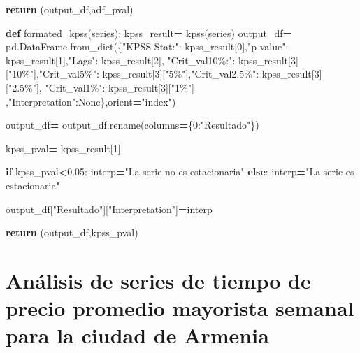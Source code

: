 \documentclass[
]{book}
\newenvironment{Shaded}{\begin{snugshade}}{\end{snugshade}}
\newcommand{\ControlFlowTok}[1]{\textcolor[rgb]{0.13,0.29,0.53}{\textbf{#1}}}
\newcommand{\DecValTok}[1]{\textcolor[rgb]{0.00,0.00,0.81}{#1}}
\newcommand{\FloatTok}[1]{\textcolor[rgb]{0.00,0.00,0.81}{#1}}
\newcommand{\KeywordTok}[1]{\textcolor[rgb]{0.13,0.29,0.53}{\textbf{#1}}}
\newcommand{\NormalTok}[1]{#1}
\newcommand{\OperatorTok}[1]{\textcolor[rgb]{0.81,0.36,0.00}{\textbf{#1}}}
\newcommand{\StringTok}[1]{\textcolor[rgb]{0.31,0.60,0.02}{#1}}
\newcommand{\VariableTok}[1]{\textcolor[rgb]{0.00,0.00,0.00}{#1}}
\begin{document}
\begin{Shaded}
\begin{Highlighting}[]
    \ControlFlowTok{return}\NormalTok{ (output\_df,adf\_pval)}


\KeywordTok{def}\NormalTok{ formated\_kpss(series):}
\NormalTok{    kpss\_result}\OperatorTok{=}\NormalTok{ kpss(series)}
\NormalTok{    output\_df}\OperatorTok{=}\NormalTok{ pd.DataFrame.from\_dict(\{}\StringTok{"KPSS Stat:"}\NormalTok{: kpss\_result[}\DecValTok{0}\NormalTok{],}\StringTok{"p{-}value"}\NormalTok{: kpss\_result[}\DecValTok{1}\NormalTok{],}\StringTok{"Lags"}\NormalTok{: kpss\_result[}\DecValTok{2}\NormalTok{],}
                            \StringTok{"Crit\_val10\%:"}\NormalTok{: kpss\_result[}\DecValTok{3}\NormalTok{][}\StringTok{"10\%"}\NormalTok{],}\StringTok{"Crit\_val5\%"}\NormalTok{: kpss\_result[}\DecValTok{3}\NormalTok{][}\StringTok{"5\%"}\NormalTok{],}\StringTok{"Crit\_val2.5\%"}\NormalTok{: kpss\_result[}\DecValTok{3}\NormalTok{][}\StringTok{"2.5\%"}\NormalTok{],}
                                       \StringTok{"Crit\_val1\%"}\NormalTok{: kpss\_result[}\DecValTok{3}\NormalTok{][}\StringTok{"1\%"}\NormalTok{]}
\NormalTok{                                       ,}\StringTok{"Interpretation"}\NormalTok{:}\VariableTok{None}\NormalTok{\},orient}\OperatorTok{=}\StringTok{"index"}\NormalTok{)}
    
\NormalTok{    output\_df}\OperatorTok{=}\NormalTok{ output\_df.rename(columns}\OperatorTok{=}\NormalTok{\{}\DecValTok{0}\NormalTok{:}\StringTok{"Resultado"}\NormalTok{\})}
    
\NormalTok{    kpss\_pval}\OperatorTok{=}\NormalTok{  kpss\_result[}\DecValTok{1}\NormalTok{]}
    
    \ControlFlowTok{if}\NormalTok{ kpss\_pval}\OperatorTok{\textless{}}\FloatTok{0.05}\NormalTok{:}
\NormalTok{        interp}\OperatorTok{=}\StringTok{"La serie no es estacionaria"}
    \ControlFlowTok{else}\NormalTok{:}
\NormalTok{        interp}\OperatorTok{=}\StringTok{"La serie es estacionaria"}
    
\NormalTok{    output\_df[}\StringTok{"Resultado"}\NormalTok{][}\StringTok{"Interpretation"}\NormalTok{]}\OperatorTok{=}\NormalTok{interp}
    
    \ControlFlowTok{return}\NormalTok{ (output\_df,kpss\_pval)}
\end{Highlighting}
\end{Shaded}

\hypertarget{anuxe1lisis-de-series-de-tiempo-de-precio-promedio-mayorista-semanal-para-la-ciudad-de-armenia}{%
\section{Análisis de series de tiempo de precio promedio mayorista semanal para la ciudad de Armenia}\label{anuxe1lisis-de-series-de-tiempo-de-precio-promedio-mayorista-semanal-para-la-ciudad-de-armenia}}
\end{document}
